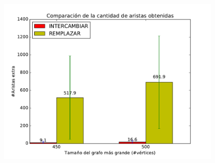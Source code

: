 \begin{figure}[H]
\begin{minipage}{0.5\textwidth}   
  \centering
    \includegraphics[width=1\textwidth]{graficos/problema_6/calidad8.pdf} 
  \caption{\footnotesize{}}
  \label{fig:calidad5-5}
\end{minipage}
\end{figure}


